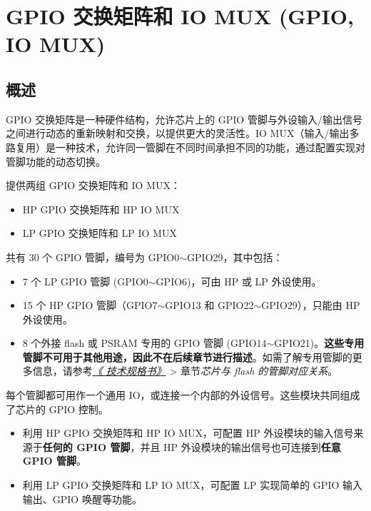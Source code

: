 \documentclass[main\_\_CN.tex]{subfiles}
\begin{document}

\ifglobal
\else
    \listoftodos
    {\let\clearpage\relax \listofdonetodos}
    \tableofcontents
\fi


\hypertarget{iomuxgpio}{}
\chapter{GPIO 交换矩阵和 IO MUX (GPIO, IO MUX)}
\label{mod:iomuxgpio}

\section{概述}

GPIO 交换矩阵是一种硬件结构，允许芯片上的 GPIO 管脚与外设输入/输出信号之间进行动态的重新映射和交换，以提供更大的灵活性。IO MUX（输入/输出多路复用）是一种技术，允许同一管脚在不同时间承担不同的功能，通过配置实现对管脚功能的动态切换。

\chipname{} 提供两组 GPIO 交换矩阵和 IO MUX：

\begin{itemize}
    \item HP GPIO 交换矩阵和 HP IO MUX
    \item LP GPIO 交换矩阵和 LP IO MUX
\end{itemize}

\chipname{} 共有 30 个 GPIO 管脚，编号为 GPIO0$\sim$GPIO29，其中包括：
\begin{itemize}
    \item 7 个 LP GPIO 管脚 (GPIO0$\sim$GPIO6)，可由 HP 或 LP 外设使用。
    \item 15 个 HP GPIO 管脚（GPIO7$\sim$GPIO13 和 GPIO22$\sim$GPIO29），只能由 HP 外设使用。
    \item 8 个外接 flash 或 PSRAM 专用的 GPIO 管脚 (GPIO14$\sim$GPIO21)。\textbf{这些专用管脚不可用于其他用途，因此不在后续章节进行描述}。如需了解专用管脚的更多信息，请参考\textit{\href{https://www.espressif.com/sites/default/files/documentation/esp32-c61_datasheet_cn.pdf}{《\chipname{} 技术规格书》}} > 章节\textit{芯片与 flash 的管脚对应关系}。
\end{itemize}
每个管脚都可用作一个通用 IO，或连接一个内部的外设信号。这些模块共同组成了芯片的 GPIO 控制。
\begin{itemize}
    \item 利用 HP GPIO 交换矩阵和 HP IO MUX，可配置 HP 外设模块的输入信号来源于\textbf{任何的 GPIO 管脚}，并且 HP 外设模块的输出信号也可连接到\textbf{任意 GPIO 管脚}。
    \item 利用 LP GPIO 交换矩阵和 LP IO MUX，可配置 LP 实现简单的 GPIO 输入输出、GPIO 唤醒等功能。
\end{itemize}
\end{document}
